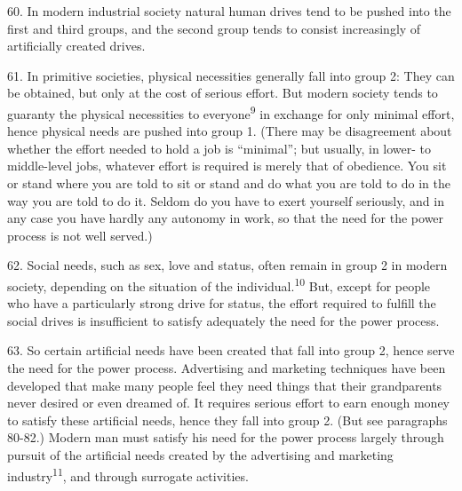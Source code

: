 \documentclass{article}
\begin{document}
60. In modern industrial society natural human drives tend to be pushed into the first and third 
groups, and the second group tends to consist increasingly of artificially created drives. \vspace{\baselineskip}

61. In primitive societies, physical necessities generally fall into group 2: They can be obtained, 
but only at the cost of serious effort. But modern society tends to guaranty the physical necessities 
to everyone\textsuperscript{9} in exchange for only minimal effort, hence physical needs are pushed into group 1. 
(There may be disagreement about whether the effort needed to hold a job is “minimal”; but 
usually, in lower- to middle-level jobs, whatever effort is required is merely that of 
obedience. You sit or stand where you are told to sit or stand and do what you are told to do in the 
way you are told to do it. Seldom do you have to exert yourself seriously, and in any case you 
have hardly any autonomy in work, so that the need for the power process is not well served.) \vspace{\baselineskip}

62. Social needs, such as sex, love and status, often remain in group 2 in modern society, 
depending on the situation of the individual.\textsuperscript{10} But, except for people who have a particularly 
strong drive for status, the effort required to fulfill the social drives is insufficient to satisfy 
adequately the need for the power process. \vspace{\baselineskip}

63. So certain artificial needs have been created that fall into group 2, hence serve the need for the 
power process. Advertising and marketing techniques have been developed that make many 
people feel they need things that their grandparents never desired or even dreamed of. It requires 
serious effort to earn enough money to satisfy these artificial needs, hence they fall into group 2. 
(But see paragraphs 80-82.) Modern man must satisfy his need for the power process largely 
through pursuit of the artificial needs created by the advertising and marketing industry\textsuperscript{11}, and 
through surrogate activities. \vspace{\baselineskip}
\end{document}
